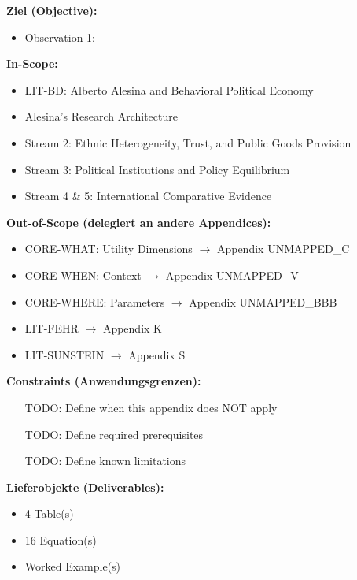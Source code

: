 \begin{tcolorbox}[
    colback=orange!5!white,
    colframe=orange!75!black,
    title={\textbf{Appendix Scope: Ziel / In-Scope / Out-of-Scope / Constraints}},
    fonttitle=\bfseries
]

\textbf{Ziel (Objective):}
\begin{itemize}[nosep]
    \item Observation 1:
\end{itemize}

\textbf{In-Scope:}
\begin{itemize}[nosep]
    \item LIT-BD: Alberto Alesina and Behavioral Political Economy
    \item Alesina's Research Architecture
    \item Stream 2: Ethnic Heterogeneity, Trust, and Public Goods Provision
    \item Stream 3: Political Institutions and Policy Equilibrium
    \item Stream 4 \& 5: International Comparative Evidence
\end{itemize}

\textbf{Out-of-Scope (delegiert an andere Appendices):}
\begin{itemize}[nosep]
    \item CORE-WHAT: Utility Dimensions $\rightarrow$ Appendix UNMAPPED_C
    \item CORE-WHEN: Context $\rightarrow$ Appendix UNMAPPED_V
    \item CORE-WHERE: Parameters $\rightarrow$ Appendix UNMAPPED_BBB
    \item LIT-FEHR $\rightarrow$ Appendix K
    \item LIT-SUNSTEIN $\rightarrow$ Appendix S
\end{itemize}

\textbf{Constraints (Anwendungsgrenzen):}
\begin{itemize}[nosep]
    \item [TODO: Define when this appendix does NOT apply]
    \item [TODO: Define required prerequisites]
    \item [TODO: Define known limitations]
\end{itemize}

\textbf{Lieferobjekte (Deliverables):}
\begin{itemize}[nosep]
    \item 4 Table(s)
    \item 16 Equation(s)
    \item Worked Example(s)
\end{itemize}

\end{tcolorbox}


